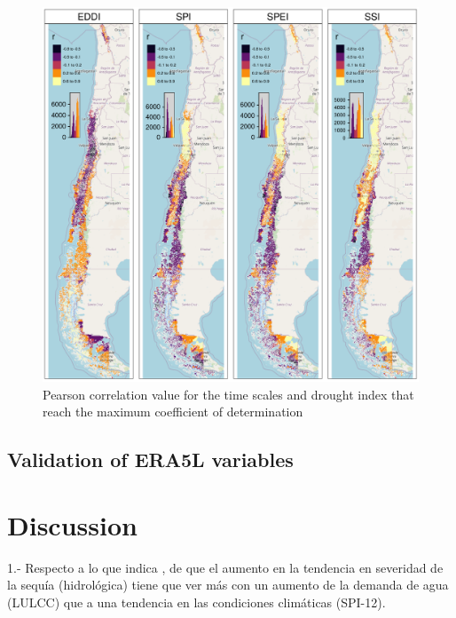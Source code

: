 \documentclass[
  authoryear,
  preprint,
  3p,
  onecolumn]{elsarticle}
\begin{document}
\begin{figure}[!ht]

{\centering \includegraphics{../output/figs/mapa_cor_r_indices_zcNDVI6.png}

}

\caption{\label{fig-corPerson}Pearson correlation value for the time
scales and drought index that reach the maximum coefficient of
determination}

\end{figure}

\hypertarget{validation-of-era5l-variables-1}{%
\subsection{Validation of ERA5L
variables}\label{validation-of-era5l-variables-1}}

\hypertarget{discussion}{%
\section{Discussion}\label{discussion}}

1.- Respecto a lo que indica \citet{Vicente-Serrano2018}, de que el
aumento en la tendencia en severidad de la sequía (hidrológica) tiene
que ver más con un aumento de la demanda de agua (LULCC) que a una
tendencia en las condiciones climáticas (SPI-12).
\end{document}
